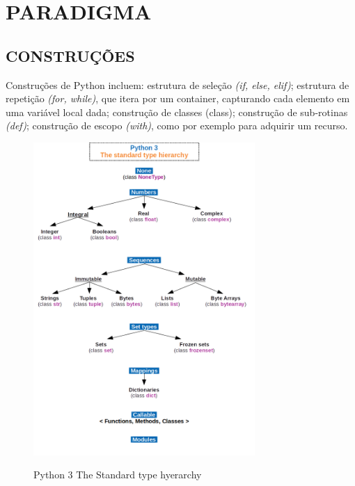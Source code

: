 
\chapter{PARADIGMA}
\label{chap:paradigma}

\section{CONSTRUÇÕES}
\label{sec:construcoes}

Construções de Python incluem: estrutura de seleção \textit{(if, else, elif)};
estrutura de repetição \textit{(for, while)}, que itera por um container, capturando cada elemento em uma variável local dada;
construção de classes (class); construção de sub-rotinas \textit{(def)};
construção de escopo \textit{(with)}, como por exemplo para adquirir um recurso.

\begin{figure}[!htb]
    \centering
    \caption{Python 3 The Standard type hyerarchy}
    \includegraphics[width=0.75\textwidth]{./dados/figuras/Python_3._The_standard_type_hierarchy.png}
    \label{fig:figura-tipos-python}
\end{figure}

